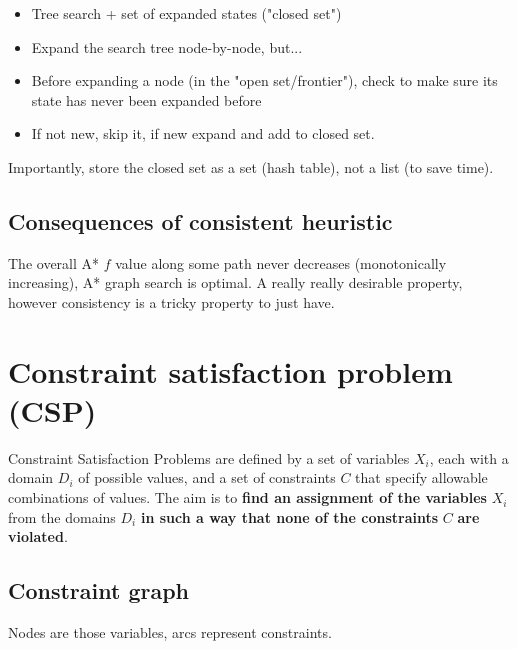 \documentclass{article}
\begin{document}
\begin{itemize}
	\item Tree search + set of expanded states ("closed set")
	\item Expand the search tree node-by-node, but...
	\item Before expanding a node (in the "open set/frontier"), check to make sure its state has never been expanded before
	\item If not new, skip it, if new expand and add to closed set.
\end{itemize}
Importantly, store the closed set as a set (hash table), {not a list} (to save time).

\subsection{Consequences of consistent heuristic}
The overall A* $f$ value along some path never decreases (monotonically increasing), A* graph search is optimal. A really really desirable property, however consistency is a tricky property to just have.

\section{Constraint satisfaction problem (CSP)}
Constraint Satisfaction Problems are defined by a set of variables $X_i$, each with a domain $D_i$ of possible values, and a set of constraints $C$ that specify allowable combinations of values. The aim is to \textbf{find an assignment of the variables} $X_i$ from the domains $D_i$ \textbf{in such a way that none of the constraints} $C$ \textbf{are violated}.

\subsection{Constraint graph}
Nodes are those variables, arcs represent constraints.
\end{document}
